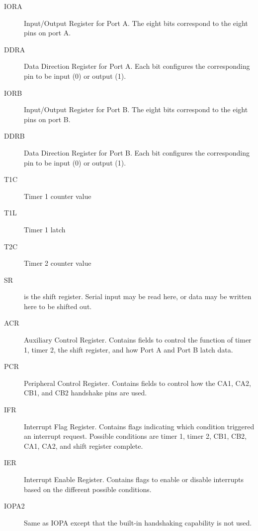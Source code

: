 \begin{description}
    \item[IORA] Input/Output Register for Port A. The eight bits correspond to the eight pins on port A.

    \item[DDRA] Data Direction Register for Port A. Each bit configures the corresponding pin to be input (0) or output (1).

    \item[IORB] Input/Output Register for Port B. The eight bits correspond to the eight pins on port B.

    \item[DDRB] Data Direction Register for Port B. Each bit configures the corresponding pin to be input (0) or output (1).

    \item[T1C] Timer 1 counter value

    \item[T1L] Timer 1 latch

    \item[T2C] Timer 2 counter value

    \item[SR] is the shift register. Serial input may be read here, or data may be written here to be shifted out.

    \item[ACR] Auxiliary Control Register. Contains fields to control the function of timer 1, timer 2, the shift register, and how Port A and Port B latch data.

    \item[PCR] Peripheral Control Register. Contains fields to control how the CA1, CA2, CB1, and CB2 handshake pins are used.

    \item[IFR] Interrupt Flag Register. Contains flags indicating which condition triggered an interrupt request. Possible conditions are timer 1, timer 2, CB1, CB2, CA1, CA2, and shift register complete.

    \item[IER] Interrupt Enable Register. Contains flags to enable or disable interrupts based on the different possible conditions.

    \item[IOPA2] Same as IOPA except that the built-in handshaking capability is not used.

\end{description}


